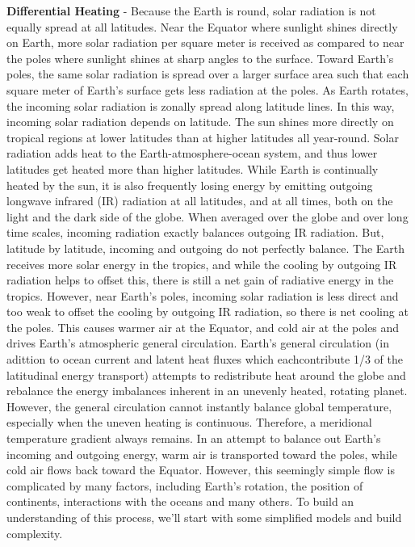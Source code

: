 \documentclass[12pt,oneside]{book}
\begin{document}
\textbf{Differential Heating} - Because the Earth is round, solar
radiation is not equally spread at all latitudes. Near the Equator where
sunlight shines directly on Earth, more solar radiation per square meter
is received as compared to near the poles where sunlight shines at sharp
angles to the surface. Toward Earth's poles, the same solar radiation is
spread over a larger surface area such that each square meter of Earth's
surface gets less radiation at the poles. As Earth rotates, the incoming
solar radiation is zonally spread along latitude lines. In this way,
incoming solar radiation depends on latitude. The sun shines more
directly on tropical regions at lower latitudes than at higher latitudes
all year-round. Solar radiation adds heat to the Earth-atmosphere-ocean
system, and thus lower latitudes get heated more than higher latitudes.
While Earth is continually heated by the sun, it is also frequently
losing energy by emitting outgoing longwave infrared (IR) radiation at
all latitudes, and at all times, both on the light and the dark side of
the globe. When averaged over the globe and over long time scales,
incoming radiation exactly balances outgoing IR radiation. But, latitude
by latitude, incoming and outgoing do not perfectly balance. The Earth
receives more solar energy in the tropics, and while the cooling by
outgoing IR radiation helps to offset this, there is still a net gain of
radiative energy in the tropics. However, near Earth's poles, incoming
solar radiation is less direct and too weak to offset the cooling by
outgoing IR radiation, so there is net cooling at the poles. This causes
warmer air at the Equator, and cold air at the poles and drives Earth's
atmospheric general circulation. Earth's general circulation (in
adittion to ocean current and latent heat fluxes which eachcontribute
1/3 of the latitudinal energy transport) attempts to redistribute heat
around the globe and rebalance the energy imbalances inherent in an
unevenly heated, rotating planet. However, the general circulation
cannot instantly balance global temperature, especially when the uneven
heating is continuous. Therefore, a meridional temperature gradient
always remains. In an attempt to balance out Earth's incoming and
outgoing energy, warm air is transported toward the poles, while cold
air flows back toward the Equator. However, this seemingly simple flow
is complicated by many factors, including Earth's rotation, the position
of continents, interactions with the oceans and many others. To build an
understanding of this process, we'll start with some simplified models
and build complexity.
\end{document}
